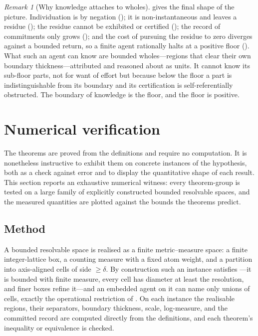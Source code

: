 \documentclass[11pt,a4paper]{article}
\theoremstyle{thmstyle}
\theoremstyle{definition}
\theoremstyle{remark}
\newtheorem{remark}[theorem]{Remark}
\newcommand{\reso}{\delta}
\begin{document}
\begin{remark}[Why knowledge attaches to wholes]
\label{rem:wholes}
 gives the final shape of the picture. Individuation is by
negation (); it is non-instantaneous and leaves a
residue (); the residue cannot be exhibited or certified
(); the record of commitments only grows
(); and the cost of pursuing the residue to zero diverges
against a bounded return, so a finite agent rationally halts at a positive floor
(). What such an agent can know are bounded wholes---regions
that clear their own boundary thickness---attributed and reasoned about as units.
It cannot know its sub-floor parts, not for want of effort but because below the
floor a part is indistinguishable from its boundary and its certification is
self-referentially obstructed. The boundary of knowledge is the floor, and the
floor is positive.
\end{remark}


\section{Numerical verification}
\label{sec:numerical}

The theorems are proved from the definitions and require no computation. It is
nonetheless instructive to exhibit them on concrete instances of the hypothesis,
both as a check against error and to display the quantitative shape of each
result. This section reports an exhaustive numerical witness: every theorem-group
is tested on a large family of explicitly constructed bounded resolvable spaces,
and the measured quantities are plotted against the bounds the theorems predict.

\subsection{Method}

A bounded resolvable space is realised as a finite metric--measure space: a finite
integer-lattice box, a counting measure with a fixed atom weight, and a partition
into axis-aligned cells of side $\ge\reso$. By construction such an instance
satisfies ---it is bounded with finite measure, every cell has
diameter at least the resolution, and finer boxes refine it---and an embedded
agent on it can name only unions of cells, exactly the operational restriction of
. On each instance the realisable regions, their separators,
boundary thickness, scale, log-measure, and the committed record are computed
directly from the definitions, and each theorem's inequality or equivalence is
checked.
\end{document}
